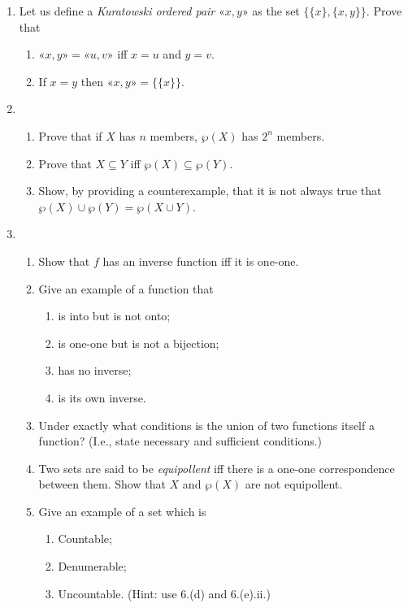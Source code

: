 {\begin{enumerate}
\item Let us define a \emph{Kuratowski ordered pair} $« x,y»$ as the set $\{\{x\},\{x,y\}\}$. Prove that \begin{enumerate} 
	\item $« x,y» = « u,v»$ iff $x=u$ and $y=v$.
	\item If $x=y$ then $« x,y» = \{\{x\}\}$.
\end{enumerate}

\item \begin{enumerate}
	\item Prove that if $X$ has $n$ members, $\wp(X)$ has $2^{n}$ members.
	\item Prove that $X \subseteq Y$ iff $\wp(X) \subseteq \wp(Y)$.
	\item Show, by providing a counterexample, that it is not always true that $\wp(X) \cup \wp(Y) = \wp(X \cup Y)$.
\end{enumerate}

\item \begin{enumerate}
	\item Show that $f$ has an inverse function iff it is one-one.
	\item Give an example of a function that \begin{enumerate}
		\item is into but is not onto;
		\item is one-one but is not a bijection;
		\item has no inverse;
		\item is its own inverse. 
	\end{enumerate}
	\item Under exactly what conditions is the union of two functions itself a function? (I.e., state necessary and sufficient conditions.)
\item Two sets are said to be \emph{equipollent} iff there is a one-one correspondence between them. Show that $X$ and $\wp(X)$ are not equipollent. 
	\item Give an example of a set which is \begin{enumerate}
		\item Countable;
		\item Denumerable;
		\item Uncountable. (Hint: use 6.(d) and 6.(e).ii.)
	\end{enumerate} 
\end{enumerate} 




\end{enumerate}}
